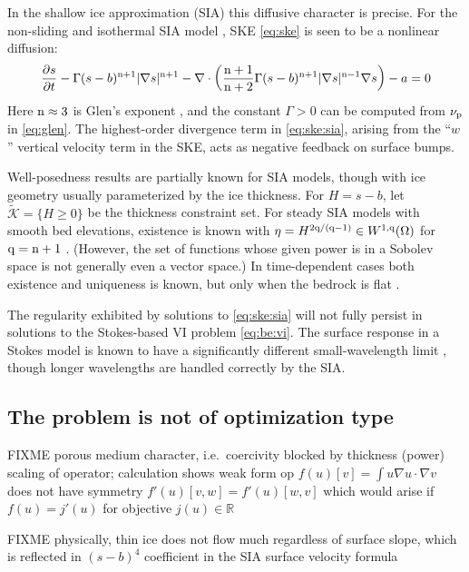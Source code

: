 \documentclass[hidelinks,onefignum,onetabnum,final]{siamart220329}  %
\newcommand{\RR}{\mathbb{R}}
\newcommand{\grad}{\nabla}
\newcommand{\Div}{\nabla\cdot}
\newcommand{\cK}{\mathcal{K}}
\newcommand{\nn}{{\text{\textnormal{n}}}}
\newcommand{\pp}{{\text{\textnormal{p}}}}
\newcommand{\qq}{{\text{\textnormal{q}}}}
\begin{document}
In the shallow ice approximation (SIA) this diffusive character is precise.  For the non-sliding and isothermal SIA model \cite{GreveBlatter2009,JouvetBueler2012}, SKE \eqref{eq:ske} is seen to be a nonlinear diffusion:
\begin{equation}
\frac{\partial s}{\partial t} - \Gamma (s-b)^{\nn+1} |\grad s|^{\nn+1} - \Div \left(\frac{\nn+1}{\nn+2} \Gamma (s-b)^{\nn+1} |\grad s|^{\nn-1} \grad s\right) - a = 0  \label{eq:ske:sia}
\end{equation}
Here $\nn\approx 3$ is Glen's exponent \cite{GreveBlatter2009}, and the constant $\Gamma>0$ can be computed from $\nu_\pp$ in \eqref{eq:glen}.  The highest-order divergence term in \eqref{eq:ske:sia}, arising from the ``$w$'' vertical velocity term in the SKE, acts as negative feedback on surface bumps.

Well-posedness results are partially known for SIA models, though with ice geometry usually parameterized by the ice thickness.  For $H=s-b$, let $\tilde{\cK} = \{H\ge 0\}$ be the thickness constraint set.   For steady SIA models with smooth bed elevations, existence is known with $\eta = H^{2\qq/(\qq-1)} \in W^{1,\qq}(\Omega)$ for $\qq=\nn+1$ \cite{JouvetBueler2012}.  (However, the set of functions whose given power is in a Sobolev space is not generally even a vector space.)  In time-dependent cases both existence and uniqueness is known, but only when the bedrock is flat \cite{Calvoetal2003,PiersantiTemam2023}.

The regularity exhibited by solutions to \eqref{eq:ske:sia} will not fully persist in solutions to the Stokes-based VI problem \eqref{eq:be:vi}.  The surface response in a Stokes model is known to have a significantly different small-wavelength limit \cite{Pattynetal2008}, though longer wavelengths are handled correctly by the SIA.

\subsection{The problem is not of optimization type} \label{subsec:notopt}  FIXME porous medium character, i.e.~coercivity blocked by thickness (power) scaling of operator; calculation shows weak form op $f(u)[v] = \int u \grad u\cdot \grad v$ does not have symmetry $f'(u)[v,w] = f'(u)[w,v]$ which would arise if $f(u)=j'(u)$ for objective $j(u) \in \RR$

FIXME physically, thin ice does not flow much regardless of surface slope, which is reflected in $(s-b)^4$ coefficient in the SIA surface velocity formula
\end{document}

